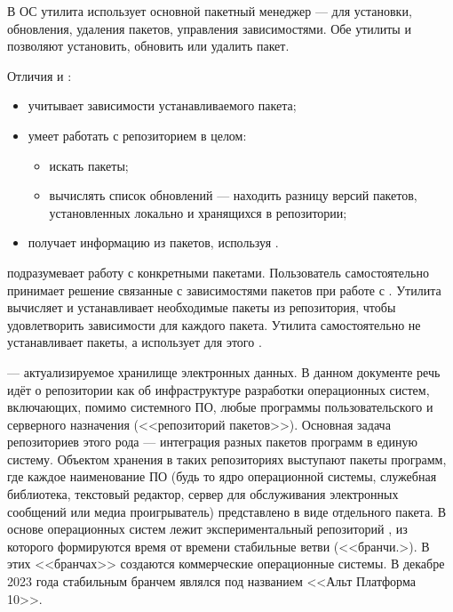 В ОС  утилита  использует основной пакетный менеджер  --- 
 для установки, обновления, удаления пакетов, управления зависимостями. Обе
утилиты  и  позволяют установить, обновить или удалить пакет.

Отличия  и :
\begin{itemize}
	\item {} учитывает зависимости устанавливаемого пакета;
	\item {} умеет работать с репозиторием в целом:
	\begin{itemize}
		\item искать пакеты;
		\item вычислять список обновлений --- находить разницу версий пакетов, 
			установленных локально и хранящихся в репозитории;
	\end{itemize}
	\item {} получает информацию из пакетов, используя .
\end{itemize}

 подразумевает работу с конкретными пакетами. Пользователь самостоятельно
принимает решение связанные с зависимостями пакетов  при работе с . Утилита 
вычисляет и устанавливает необходимые пакеты из репозитория, чтобы удовлетворить зависимости для
каждого  пакета. Утилита  самостоятельно не устанавливает пакеты, а использует для этого .

	
 --- актуализируемое хранилище электронных данных.
В данном документе речь идёт о репозитории как об инфраструктуре разработки операционных систем, включающих, 
помимо системного ПО, любые программы пользовательского и серверного назначения (<<репозиторий пакетов>>). 
Основная задача репозиториев этого рода --- интеграция разных пакетов программ в единую систему. Объектом 
хранения в таких репозиториях выступают пакеты программ, где каждое наименование ПО (будь то ядро операционной 
системы, служебная библиотека, текстовый редактор, сервер для обслуживания электронных сообщений или медиа 
проигрыватель) представлено в виде отдельного пакета. В основе операционных систем  лежит экспериментальный репозиторий , из которого формируются время от времени стабильные ветви (<<бранчи.>). В этих <<бранчах>> создаются коммерческие операционные системы. В декабре 2023 года стабильным бранчем являлся  под названием <<Альт Платформа 10>>.

